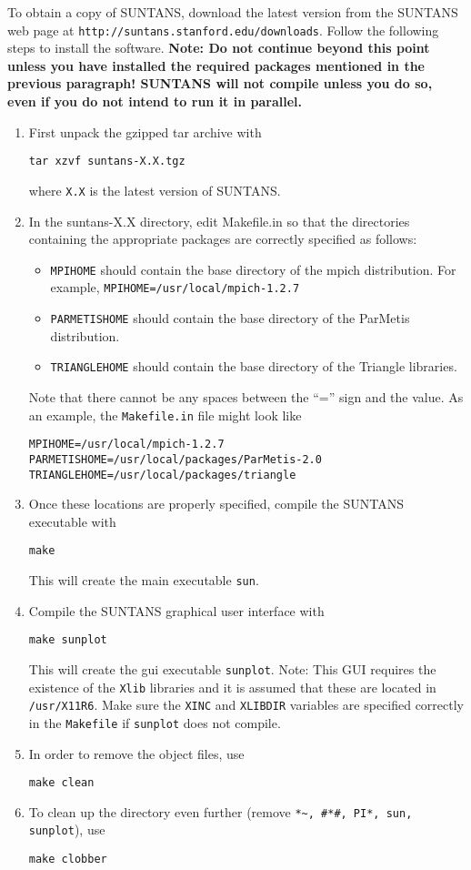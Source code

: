 \documentclass[12pt,oneside]{article}
\begin{document}
To obtain a copy of SUNTANS, download the latest version from the SUNTANS
web page at \verb+http://suntans.stanford.edu/downloads+.  Follow the following
steps to install the software.  {\bf Note: Do not continue beyond this point unless
you have installed the required packages mentioned in the previous paragraph!
SUNTANS will not compile unless you do so, even if you do not intend to run it in
parallel.}
\begin{enumerate}
\item First unpack the gzipped tar archive with
\begin{verbatim}
tar xzvf suntans-X.X.tgz
\end{verbatim}
where \verb+X.X+ is the latest version of SUNTANS.  
\item In the suntans-X.X directory, edit Makefile.in so that the directories containing the appropriate packages
are correctly specified as follows:
\begin{itemize}
\item \verb+MPIHOME+ should contain the base directory of the mpich distribution.
For example, 
\verb+MPIHOME=/usr/local/mpich-1.2.7+
\item \verb+PARMETISHOME+ should contain the base directory of the ParMetis distribution.
\item \verb+TRIANGLEHOME+ should contain the base directory of the Triangle libraries.
\end{itemize}
Note that there cannot be any spaces between the ``='' sign and the value.  As an example,
the \verb+Makefile.in+ file might look like
\begin{verbatim}
MPIHOME=/usr/local/mpich-1.2.7
PARMETISHOME=/usr/local/packages/ParMetis-2.0
TRIANGLEHOME=/usr/local/packages/triangle
\end{verbatim}
\item Once these locations are properly specified, compile the SUNTANS executable with
\begin{verbatim}
make
\end{verbatim}
This will create the main executable \verb+sun+.
\item Compile the SUNTANS graphical user interface with
\begin{verbatim}
make sunplot
\end{verbatim}
This will create the gui executable \verb+sunplot+.  Note:  This GUI requires the
existence of the \verb+Xlib+ libraries and it is assumed that these are located
in \verb+/usr/X11R6+.  Make sure the \verb+XINC+ and \verb+XLIBDIR+ variables
are specified correctly in the \verb+Makefile+ if \verb+sunplot+ does not compile.
\item In order to remove the object files, use
\begin{verbatim}
make clean
\end{verbatim}
\item To clean up the directory even further (remove \verb+*~, #*#, PI*, sun, sunplot+),
use
\begin{verbatim}
make clobber
\end{verbatim}
\end{enumerate}
\end{document}
